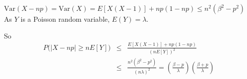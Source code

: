 \documentclass[12pt,thmsa]{article}
\begin{document}
\begin{enumerate}
\begin{itemize}
$\text{Var}(X-np)=\text{Var}(X)= E[X(X-1)]+np(1-np) \leq n^2(\beta^2 -p^2)$\\

As $Y$ is a Poisson random variable, $E(Y)=\lambda$.

So
 \begin{eqnarray*}
  P\Big( \vert X-np \vert \geq nE[Y] \Big)  &\leq&  \frac{E[X(X-1)]+np(1-np)}{(nE[Y])^2}\\
&\leq&   \frac{ n^2(\beta^2 -p^2)}{(n\lambda)^2}= \left(\frac{\beta -p }{\lambda}\right) \left(\frac{\beta + p}{\lambda} \right)
 \end{eqnarray*}

\end{itemize}
\end{enumerate}
\end{document}
